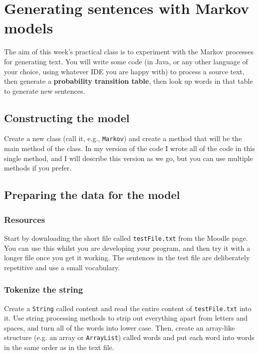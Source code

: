 \documentclass[11pt]{article}
\author{Tristan Strange}
\date{\today}
\title{}
\begin{document}
\tableofcontents

\section{Generating sentences with Markov models}
\label{sec:org5c21516}
The aim of this week’s practical class is to experiment with the Markov
processes for generating text. 
You will write some code (in Java, or any other language of your choice, using whatever IDE you are happy with) to process a source text, then generate a \textbf{probability transition table}, then look up words in that table to generate new sentences.


\subsection{Constructing the model}
\label{sec:org586e241}
Create a new class (call it, e.g., \texttt{Markov}) and create a method that will be the
 main method of the class.
 In my version of the code I wrote all of the code in this single method, and I will describe this version as we go, but you can use multiple methods if you prefer.

\subsection{Preparing the data for the model}
\label{sec:org7da58f3}
\subsubsection{Resources}
\label{sec:org8ef1268}
Start by downloading the short file called \texttt{testFile.txt} from the Moodle page.
You can use this whilst you are developing your program, and then try it with a
 longer file once you get it working.
 The sentences in the test file are deliberately repetitive and use a small vocabulary.

\subsubsection{Tokenize the string}
\label{sec:org0733a4a}
Create a \texttt{String} called content and read the entire content of \texttt{testFile.txt} into it. 
Use string processing methods to strip out everything apart from letters and
spaces, and turn all of the words into lower case.
Then, create an array-like structure (e.g. an array or \texttt{ArrayList}) called words and put each word into words in the same order as in the text file.
\end{document}
